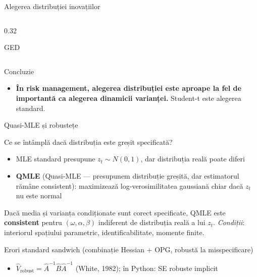 \documentclass[9pt, aspectratio=169, t]{beamer}
\begin{document}
\begin{frame}{Alegerea distribuției inovațiilor}
\begin{columns}[T]
\begin{column}{0.32\textwidth}
\begin{block}{\centering GED}
                \end{block}
            \end{column}
        \end{columns}
        \vspace{0.2cm}
        \begin{alertblock}{Concluzie}
            \begin{itemize}
                \item \textbf{În risk management, alegerea distribuției este aproape la fel de importantă ca alegerea dinamicii varianței.} Student-t este alegerea standard.
            \end{itemize}
        \end{alertblock}
\end{frame}

\begin{frame}{Quasi-MLE și robustețe}
    \small
        \setlength{\abovedisplayskip}{1pt}\setlength{\belowdisplayskip}{1pt}
        \vspace{-0.4cm}
        \begin{block}{Ce se întâmplă dacă distribuția este greșit specificată?}
            \begin{itemize}
                \item MLE standard presupune $z_t \sim N(0,1)$, dar distribuția reală poate diferi
                \item \textbf{QMLE} (Quasi-MLE --- presupunem distribuție greșită, dar estimatorul rămâne consistent): maximizează log-verosimilitatea gaussiană chiar dacă $z_t$ nu este normal
            \end{itemize}
        \end{block}
        \vspace{-0.3cm}
        \begin{thm}
            Dacă media și varianța condiționate sunt corect specificate, QMLE este \textbf{consistent} pentru $(\omega, \alpha, \beta)$ indiferent de distribuția reală a lui $z_t$.
            \textit{Condiții}: interiorul spațiului parametric, identificabilitate, momente finite.
        \end{thm}
        \vspace{-0.3cm}
        \begin{alertblock}{Erori standard sandwich (combinație Hessian + OPG, robustă la misspecificare)}
            \begin{itemize}
                \item $\hat{V}_{\text{robust}} = \hat{A}^{-1} \hat{B} \hat{A}^{-1}$ (White, 1982); în Python: SE robuste implicit

\end{itemize}
\end{alertblock}
\end{frame}
\end{document}
